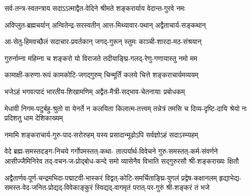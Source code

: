 
\twolineshloka
{सर्व-तन्त्र-स्वतन्त्राय सदाऽऽत्माद्वैत-वेदिने}
{श्रीमते शङ्करार्याय वेदान्त-गुरवे नमः}

\twolineshloka
{अविप्लुत-ब्रह्मचर्यान् अन्वितेन्द्र-सरस्वतीन्}
{आत्त-मिथ्यावार-पथान् अद्वैताचार्य-सङ्कथान्}

\twolineshloka
{आ-सेतु-हिमवच्छैलं सदाचार-प्रवर्तकान्}
{जगद्-गुरून् स्तुमः काञ्ची-शारदा-मठ-संश्रयान्}


\twolineshloka
{गुरुर्नाम्ना महिम्ना च शङ्करो यो विराजते}
{तदीयाङ्घ्रि-गलद्-रेणु-गणायास्तु नमो मम}


\twolineshloka
{कामाक्षी-करुणा-रूपं कामकोटि-जगद्गुरुम्}
{चिन्मूर्तिं कलये चित्ते शङ्कराचार्यमव्ययम्}


\twolineshloka
{भजेऽहं भगवत्पादं भारतीय-शिखामणिम्}
{अद्वैत-मैत्री-सद्भाव-चेतनायाः प्रबोधकम्}




\twolineshloka
{मेधावी निगम-पटुर्बहु-श्रुतो वा येनर्ते न कलयिता किलात्म-तत्त्वम्}
{तन्नेत्रं तमसि च दिव्य-दृष्टि-दायि श्रेयो नः प्रदिशतु धाम देशिकाख्यम्}


\twolineshloka
{नमामि शङ्कराचार्य-गुरु-पाद-सरोरुहम्}
{यस्य प्रसादान्मूढोऽपि सर्वज्ञोऽहं सदाऽस्म्यहम्}

\fourlineindentedshloka
{वेदे ब्रह्म-समस्तदङ्ग-निचये गर्गोपमस्तत्-कथा-}
{तात्पर्यार्थ-विवेचने गुरु-समस्तत्-कर्म-संवर्णने}
{आसीज्जैमिनिरेव तद्-वचन-ज-प्रोद्बोध-कन्दे समो}
{व्यासेनैव विभाति सद्गुरुरसौ श्री-शङ्कराख्यः क्षितौ}

\fourlineindentedshloka
{अद्वैतार्णव-पूर्ण-चन्द्रमभिदा-पद्माटवी-भास्करं}
{विद्वत्-कोटि-समर्चिताङ्घ्रि-युगलं प्रद्वेष-कक्षानलम्}
{हृद्याभेद्य-समस्त-वेद-जनित-प्रोद्यद्-विवेकाङ्कुरं}
{स्विद्यद्-वागमृतं परात्-पर-गुरुं श्री-शङ्करं तं भजे}


